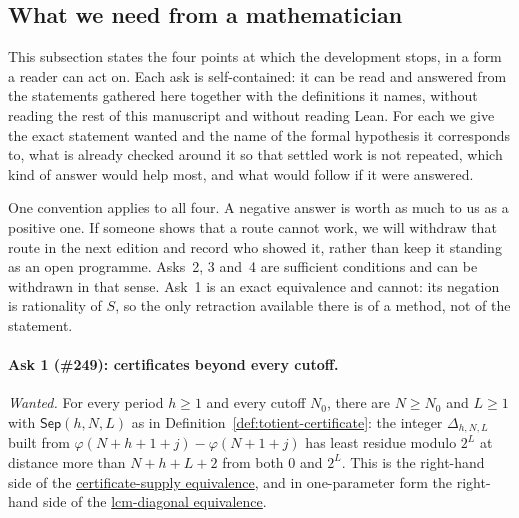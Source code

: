 \documentclass[11pt]{article}
\newcommand{\commit}{bb4e24651b37cd096d3749ef299c3317930b3a3b}
\newcommand{\repobase}{https://github.com/wcook04/plectis-lean-erdos249-257/blob/\commit}
\newcommand{\PK}{Erdos249257}
\newcommand{\lword}[4]{\href{\repobase/\PK/#1\#L#2}{#4}}
\theoremstyle{definition}
\theoremstyle{remark}
\newcommand{\ph}{\varphi}
\begin{document}
\subsection{What we need from a mathematician}\label{sec:asks}

This subsection states the four points at which the development stops, in a
form a reader can act on.  Each ask is self-contained: it can be read and
answered from the statements gathered here together with the definitions it
names, without reading the rest of this manuscript and without reading Lean.
For each we give the exact statement wanted and the name of the formal
hypothesis it corresponds to, what is already checked around it so that
settled work is not repeated, which kind of answer would help most, and what
would follow if it were answered.

One convention applies to all four.  A negative answer is worth as much to us
as a positive one.  If someone shows that a route cannot work, we will
withdraw that route in the next edition and record who showed it, rather than
keep it standing as an open programme.  Asks~2, 3 and~4 are sufficient
conditions and can be withdrawn in that sense.  Ask~1 is an exact
equivalence and cannot: its negation is rationality of \(S\), so the only
retraction available there is of a method, not of the statement.

\paragraph{Ask 1 (\#249): certificates beyond every cutoff.}
\emph{Wanted.}  For every period \(h\ge1\) and every cutoff \(N_0\), there
are \(N\ge N_0\) and \(L\ge1\) with \(\mathsf{Sep}(h,N,L)\) as in
Definition~\ref{def:totient-certificate}: the integer \(\Delta_{h,N,L}\)
built from \(\ph(N{+}h{+}1{+}j)-\ph(N{+}1{+}j)\) has least residue modulo
\(2^L\) at distance more than \(N+h+L+2\) from both \(0\) and \(2^L\).  This
is the right-hand side of the
\lword{LcmConeFlatness.lean}{412}{irrational_totient_series_iff_certificate_supply}{certificate-supply equivalence},
and in one-parameter form the right-hand side of the
\lword{LcmConeFlatness.lean}{426}{irrational_totient_series_iff_lcm_diagonal_certificate_supply}{lcm-diagonal equivalence}.
\end{document}
